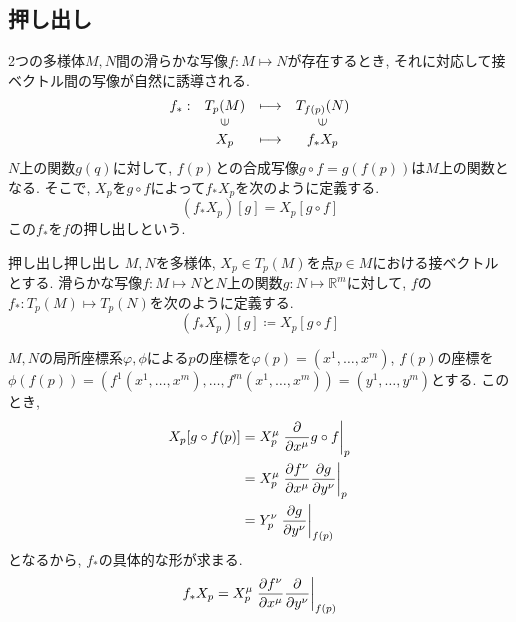 \documentclass[../main.tex]{subfiles}
\begin{document}
    \subsection{押し出し}
        2つの多様体$M,N$間の滑らかな写像$f : M \mapsto N$が存在するとき, それに対応して接ベクトル間の写像が自然に誘導される.
        \begin{equation}
            \begin{array}{cccc}
                f_* : & T_p(M)                & \longmapsto & T_{f(p)}(N) \\
                      & \rotatebox{90}{$\in$} &             & \rotatebox{90}{$\in$} \\
                      & X_p                   & \longmapsto & f_*X_p
            \end{array}
        \end{equation}
        $N$上の関数$g(q)$に対して, $f(p)$との合成写像$g \circ f=g(f(p))$は$M$上の関数となる.
        そこで, $X_p$を$g \circ f$によって$f_*X_p$を次のように定義する.
        \begin{equation}
            (f_*X_p)[g] = X_p[g \circ f]
        \end{equation}
        この$f_*$を$f$の押し出しという.
        \begin{dfn}{押し出し}{押し出し}
            $M,N$を多様体, $X_p \in T_p(M)$を点$p \in M$における接ベクトルとする.
            滑らかな写像$f : M \mapsto N$と$N$上の関数$g : N \mapsto \mathbb{R}^m$に対して,
            $f$の$f_* : T_p(M) \mapsto T_p(N)$を次のように定義する.
            \begin{equation}
                (f_*X_p)[g] \coloneqq X_p[g \circ f]
            \end{equation}
        \end{dfn}
        $M,N$の局所座標系$\varphi,\phi$による$p$の座標を$\varphi(p)=(x^1,\ldots,x^m)$,
        $f(p)$の座標を$\phi(f(p)) = (f^1(x^1,\ldots,x^m),\ldots,f^m(x^1,\ldots,x^m))=(y^1,\ldots,y^m)$とする.
        このとき,
        \begin{align}
            X_p[g \circ f(p)] &= X_p^\mu \eval{\pdv{x^\mu}g \circ f}_p \nonumber \\
                              &= X_p^\mu \eval{\pdv{f^\nu}{x^\mu}\pdv{g}{y^\nu}}_p \nonumber \\
                              &= Y_p^\nu \eval{\pdv{g}{y^\nu}}_{f(p)}
        \end{align}
        となるから, $f_*$の具体的な形が求まる.
        \begin{equation}
            f_*X_p = X_p^\mu \eval{\pdv{f^\nu}{x^\mu}\pdv{y^\nu}}_{f(p)}
        \end{equation}
\end{document}

